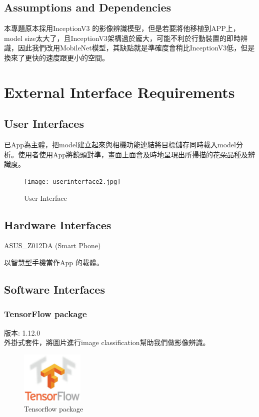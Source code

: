 \documentclass{scrreprt}
\begin{document}
\section{Assumptions and Dependencies}
\begin{CJK}{UTF8}{bkai}
	本專題原本採用InceptionV3 的影像辨識模型，但是若要將他移植到APP上，model size太大了，且InceptionV3架構過於龐大，可能不利於行動裝置的即時辨識，因此我們改用MobileNet模型，其缺點就是準確度會稍比InceptionV3低，但是換來了更快的速度跟更小的空間。
\end{CJK}


\chapter{External Interface Requirements}

\section{User Interfaces}
\begin{CJK}{UTF8}{bkai}
		已App為主體，把model建立起來與相機功能連結將目標儲存同時載入model分析。使用者使用App將鏡頭對準，畫面上面會及時地呈現出所掃描的花朵品種及辨識度。
\end{CJK}
\begin{figure}[h]
\begin{center}
\texttt{[image: userinterface2.jpg]}
\end{center}
\caption{User Interface}
\end{figure}

\section{Hardware Interfaces}
ASUS_Z012DA (Smart Phone)  \\
\begin{CJK}{UTF8}{bkai}
		以智慧型手機當作App 的載體。
\end{CJK}

\section{Software Interfaces}
\subsection{TensorFlow package}
\begin{CJK}{UTF8}{bkai}
版本: 1.12.0 \\
		外掛式套件，將圖片進行image classification幫助我們做影像辨識。
\end{CJK}
\begin{figure}[h]
\begin{center}
\includegraphics[width=3cm]{tensorflow.jpg}
\end{center}
\caption{Tensorflow package}
\end{figure}
\end{document}

